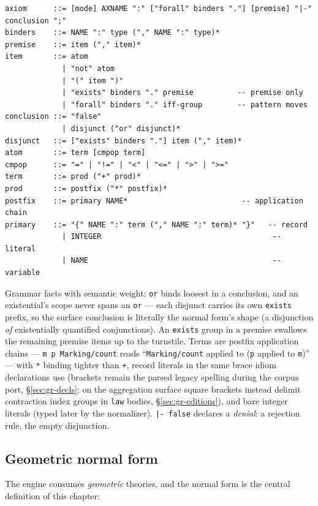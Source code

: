 \begin{Verbatim}[fontsize=\small,frame=leftline,rulecolor=\color{accentmid},framesep=3mm,xleftmargin=3mm]
axiom      ::= [mode] AXNAME ":" ["forall" binders "."] [premise] "|-" conclusion ";"
binders    ::= NAME ":" type ("," NAME ":" type)*
premise    ::= item ("," item)*
item       ::= atom
             | "not" atom
             | "(" item ")"
             | "exists" binders "." premise          -- premise only
             | "forall" binders "." iff-group        -- pattern moves
conclusion ::= "false"
             | disjunct ("or" disjunct)*
disjunct   ::= ["exists" binders "."] item ("," item)*
atom       ::= term [cmpop term]
cmpop      ::= "=" | "!=" | "<" | "<=" | ">" | ">="
term       ::= prod ("+" prod)*
prod       ::= postfix ("*" postfix)*
postfix    ::= primary NAME*                          -- application chain
primary    ::= "{" NAME ":" term ("," NAME ":" term)* "}"   -- record
             | INTEGER                                       -- literal
             | NAME                                          -- variable
\end{Verbatim}

\noindent Grammar facts with semantic weight: \texttt{or} binds
loosest in a conclusion, and an existential's scope never spans an
\texttt{or} — each disjunct carries its own \texttt{exists} prefix,
so the surface conclusion is literally the normal form's shape (a
disjunction \emph{of} existentially quantified conjunctions). An
\texttt{exists} group in a premise swallows the remaining premise
items up to the turnstile. Terms are postfix application chains —
\texttt{m p Marking/count} reads ``\texttt{Marking/count} applied to
(\texttt{p} applied to \texttt{m})'' — with \texttt{*} binding
tighter than \texttt{+}, record literals in the same brace idiom
declarations use (brackets remain the parsed legacy spelling during
the corpus port, \S\ref{sec:gr-decls}; on the aggregation surface
square brackets instead delimit contraction index groups in
\texttt{law} bodies, \S\ref{sec:gr-editions}), and bare integer
literals (typed later by the
normalizer). \texttt{|- false} declares a \emph{denial}: a rejection
rule, the empty disjunction.

\subsection{Geometric normal form}
\label{sec:gr-gnf}

The engine consumes \emph{geometric} theories, and the normal form is
the central definition of this chapter:

